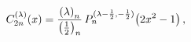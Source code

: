 \[\mathop{C^{(\lambda)}_{2n}\/}\nolimits\!\left(x\right)=\frac{\left(\lambda%
\right)_{n}}{\left(\tfrac{1}{2}\right)_{n}}\mathop{P^{(\lambda-\frac{1}{2},-%
\frac{1}{2})}_{n}\/}\nolimits\!\left(2x^{2}-1\right),\]